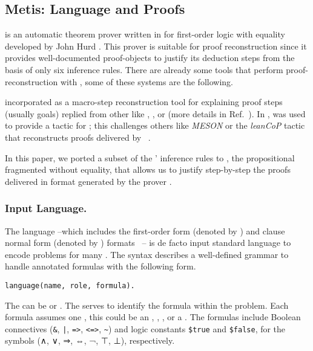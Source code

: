 \documentclass[../main.tex]{subfiles}
\begin{document}

\subsection{Metis: Language and Proofs}
\label{ssec:metis-language-and-proofs}

\Metis is an automatic theorem prover written in 
for first-order logic with equality developed by John Hurd
\cite{hurd2003first}. This prover is suitable for proof
reconstruction since it provides well-documented proof-objects to
justify its deduction steps from the basis of only six inference
rules. There are already some tools that perform proof-reconstruction
with \Metis, some of these systems are the following.

 incorporated \Metis as a macro-step
reconstruction tool for explaining proof steps (usually \CNF goals)
replied from other \ATPs like , , or
 (more details in Ref.~\cite{paulson2007source}).
In \cite{Farber2015}, \Metis was used to provide a tactic for
; this challenges others like \emph{MESON}
or the \emph{leanCoP} tactic that reconstructs proofs
delivered by ~\cite{Farber2016}.

In this paper, we ported a subset of the \Metis' inference rules to
\Agda, the propositional fragmented without equality, that allows us to justify step-by-step the proofs delivered in
\TSTP format generated by the prover \Metis.


\subsubsection{Input Language.}
\label{ssec:input-language}

The \TPTP language --which includes the first-order
form (denoted by ) and clause normal form (denoted by
) formats~\cite{sutcliffe2009} -- is de facto input
standard language to encode problems for many \ATPs. The \TPTP
syntax describes a well-defined grammar to handle annotated formulas
with the following form.

\begin{verbatim}
language(name, role, formula).
\end{verbatim}

The  can be  or . The 
serves to identify the formula within the problem. Each formula
assumes one , this could be an ,
, , or a .
The formulas include Boolean connectives (\verb!&!, \verb!|!,
\verb!=>!, \verb!<=>!, \verb!~!) and logic constants \verb!$true!
and \verb!$false!, for the symbols (∧, ∨, ⇒, ⇔, ¬, ⊤, ⊥), respectively.
\end{document}
